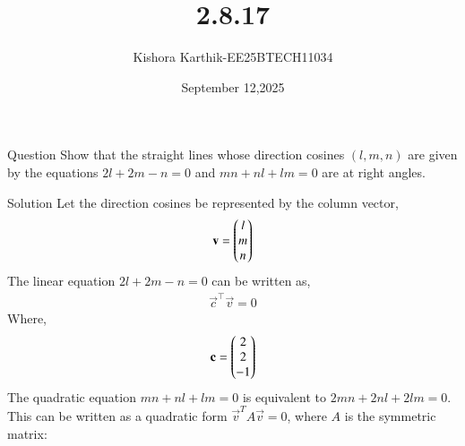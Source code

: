 \documentclass{beamer}
\begin{document}
\title 
{2.8.17}
\date{September 12,2025}


\author 
{Kishora Karthik-EE25BTECH11034}
\frame{\titlepage}
\begin{frame}{Question}
Show that the straight lines whose direction cosines $(l, m, n)$ are given by the equations $2l + 2m - n = 0$ and $mn + nl + lm = 0$ are at right angles.\\
\end{frame}



\begin{frame}{ Solution}
Let the direction cosines be represented by the column vector,
\begin{align}
    \mathbf{v}=\begin{pmatrix}l \\ m \\ n\end{pmatrix}
\end{align}
The linear equation $2l + 2m - n = 0$ can be written as,
\begin{align}
    \vec{c}^\top\vec{v}=0
\end{align}
Where,
\begin{align}
    \mathbf{c}=\begin{pmatrix}2\\2\\-1\end{pmatrix}
\end{align}
The quadratic equation $mn + nl + lm = 0$ is equivalent to $2mn + 2nl + 2lm = 0$. This can be written as a quadratic form $\vec{v}^T A \vec{v} = 0$, where $A$ is the symmetric matrix:
\end{frame}
\end{document}
